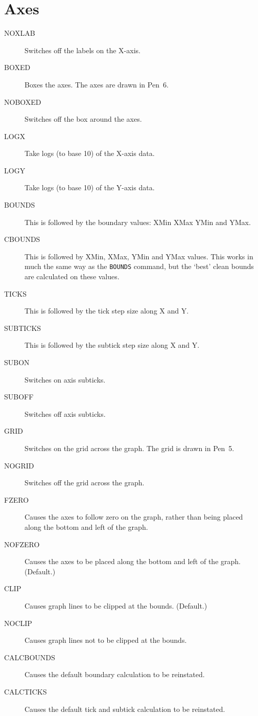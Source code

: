 \section{Axes}
\begin{description}
\item[NOXLAB] Switches off the labels on the X-axis.
\item[BOXED]  Boxes the axes. The axes are drawn in Pen~6.
\item[NOBOXED\dag]  Switches off the box around the axes. 
\item[LOGX] Take logs (to base 10) of the X-axis data.
\item[LOGY] Take logs (to base 10) of the Y-axis data.
\item[BOUNDS] This is followed by the boundary values: XMin XMax YMin and YMax.
\item[CBOUNDS\dag] This is followed by XMin, XMax, YMin and YMax values. This works 
in much the same way as the {\tt BOUNDS} command, but the `best' clean bounds are 
calculated on these values.
\item[TICKS]  This is followed by the tick step size along X and Y.
\item[SUBTICKS]  This is followed by the subtick step size along X and Y.
\item[SUBON] Switches on axis subticks.
\item[SUBOFF] Switches off axis subticks.
\item[GRID] Switches on the grid across the graph. The grid is drawn in Pen~5.
\item[NOGRID\dag] Switches off the grid across the graph. 
\item[FZERO] Causes the axes to follow zero on the graph, rather than being 
placed along the bottom and left of the graph.
\item[NOFZERO\dag] Causes the axes to be placed along the bottom and left of the 
graph. (Default.)
\item[CLIP] Causes graph lines to be clipped at the bounds. (Default.)
\item[NOCLIP] Causes graph lines not to be clipped at the bounds.
\item[CALCBOUNDS\dag] Causes the default boundary calculation to be reinstated.
\item[CALCTICKS\dag] Causes the default tick and subtick calculation to be reinstated.
\end{description}

